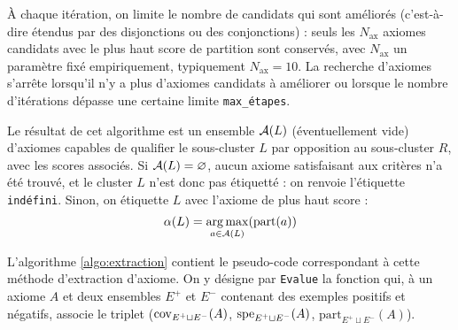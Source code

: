 À chaque itération, on limite le nombre de candidats qui sont améliorés (c'est-à-dire étendus par des disjonctions ou des conjonctions) : seuls les $N_\text{ax}$ axiomes candidats avec le plus haut score de partition sont conservés, avec $N_\text{ax}$ un paramètre fixé empiriquement, typiquement $N_\text{ax} = 10$. La recherche d'axiomes s'arrête lorsqu'il n'y a plus d'axiomes candidats à améliorer ou lorsque le nombre d'itérations dépasse une certaine limite \texttt{max\_étapes}. %

Le résultat de cet algorithme est un ensemble $\cal{A}(L)$ (éventuellement vide) d'axiomes capables de qualifier le sous-cluster $L$ par opposition au sous-cluster $R$, avec les scores associés. Si $\cal{A}(L) = \varnothing$, aucun axiome satisfaisant aux critères n'a été trouvé, et le cluster $L$ n'est donc pas étiquetté : on renvoie l'étiquette \texttt{indéfini}. Sinon, on étiquette $L$ avec l'axiome de plus haut score :
\begin{equation}
    \alpha(L) = \argmax_{a \in \cal{A}(L)}(\text{part}(a))
\end{equation}

L'algorithme \ref{algo:extraction} contient le pseudo-code correspondant à cette méthode d'extraction d'axiome. On y désigne par \texttt{Evalue} la fonction qui, à un axiome $A$ et deux ensembles $E^+$ et $E^-$ contenant des exemples positifs et négatifs, associe le triplet ($\cov_{E^+ \sqcup E^-}(A)$, $\spe_{E^+ \sqcup E^-}(A)$, $\textrm{part}_{E^+ \sqcup E^-}(A)$).


